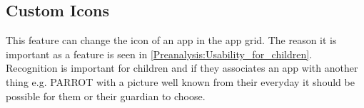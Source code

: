 \subsection*{Custom Icons}
\label{backlog:custom_icons}

This feature can change the icon of an app in the app grid. The reason it is important as a feature is seen in \autoref{Preanalysis:Usability_for_children}. Recognition is important for children and if they associates an app with another thing e.g. PARROT with a picture well known from their everyday it should be possible for them or their guardian to choose.